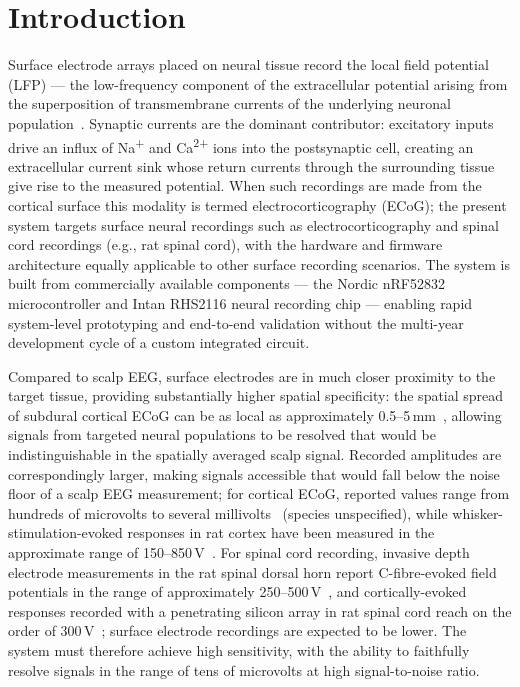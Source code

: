 \section{Introduction}

Surface electrode arrays placed on neural tissue record the local field
potential (LFP) --- the low-frequency component of the extracellular
potential arising from the superposition of transmembrane currents of
the underlying neuronal population~\cite{buzsaki2012origin}. Synaptic
currents are the dominant contributor: excitatory inputs drive an influx
of Na\textsuperscript{+} and Ca\textsuperscript{2+} ions into the
postsynaptic cell, creating an extracellular current sink whose return
currents through the surrounding tissue give rise to the measured
potential. When such recordings are made from the cortical surface this
modality is termed electrocorticography (ECoG); the present system
targets surface neural recordings such as electrocorticography and spinal cord
recordings (e.g., rat spinal cord), with the hardware and firmware architecture
equally applicable to other surface recording scenarios. The system is built from commercially available
components --- the Nordic nRF52832 microcontroller and Intan RHS2116 neural
recording chip --- enabling rapid system-level prototyping and end-to-end
validation without the multi-year development cycle of a custom integrated
circuit.

Compared to scalp EEG, surface electrodes are in much closer proximity
to the target tissue, providing substantially higher spatial specificity:
the spatial spread of subdural cortical ECoG can be as local as approximately
0.5--5\,mm~\cite{schwartz2006brain, dubey2019cortical, thielen2023making},
allowing signals from targeted neural populations to be resolved that
would be indistinguishable in the spatially averaged scalp signal.
Recorded amplitudes are correspondingly larger, making signals accessible
that would fall below the noise floor of a scalp EEG measurement; for cortical
ECoG, reported values range from hundreds of microvolts to several
millivolts~\cite{thielen2023making} (species unspecified), while
whisker-stimulation-evoked responses in rat cortex have been measured
in the approximate range of 150--850\,\textmu{}V~\cite{buzsaki2012origin,
helmchen1999vivo}. For spinal cord recording, invasive depth electrode
measurements in the rat spinal dorsal horn report C-fibre-evoked field
potentials in the range of approximately 250--500\,\textmu{}V~\cite{sandkuhler1998induction},
and cortically-evoked responses recorded with a penetrating silicon array
in rat spinal cord reach on the order of 300\,\textmu{}V~\cite{song2017spinal};
surface electrode recordings are expected to be lower. The system must
therefore achieve high sensitivity, with the ability to faithfully resolve
signals in the range of tens of microvolts at high signal-to-noise ratio.

